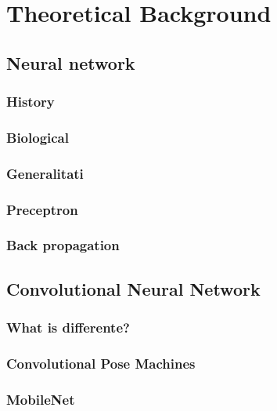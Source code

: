 \chapter{Theoretical Background}

\section{Neural network}
\subsection{History}
\subsection{Biological}
\subsection{Generalitati}
\subsection{Preceptron}
\subsection{Back propagation}

\section{Convolutional Neural Network}
\subsection{What is differente?}
\subsection{Convolutional Pose Machines}
\subsection{MobileNet}

